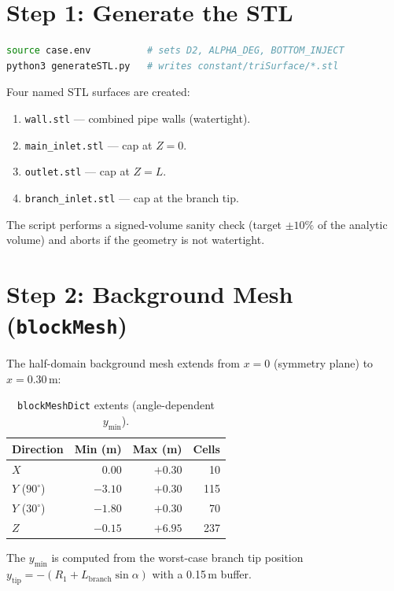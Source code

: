 \documentclass[12pt,a4paper]{report}
\begin{document}
\section{Step 1: Generate the STL}

\begin{lstlisting}[language=bash,numbers=none]
source case.env          # sets D2, ALPHA_DEG, BOTTOM_INJECT
python3 generateSTL.py   # writes constant/triSurface/*.stl
\end{lstlisting}

Four named STL surfaces are created:
\begin{enumerate}
  \item \texttt{wall.stl} --- combined pipe walls (watertight).
  \item \texttt{main\_inlet.stl} --- cap at $Z = 0$.
  \item \texttt{outlet.stl} --- cap at $Z = L$.
  \item \texttt{branch\_inlet.stl} --- cap at the branch tip.
\end{enumerate}

The script performs a signed-volume sanity check (target $\pm 10\%$
of the analytic volume) and aborts if the geometry is not watertight.


\section{Step 2: Background Mesh (\texttt{blockMesh})}

The half-domain background mesh extends from $x = 0$ (symmetry plane)
to $x = 0.30$\,m:

\begin{table}[H]
\centering
\caption{\texttt{blockMeshDict} extents (angle-dependent $y_{\min}$).}
\begin{tabular}{@{}lrrr@{}}
\toprule
\textbf{Direction} & \textbf{Min (m)} & \textbf{Max (m)} & \textbf{Cells} \\
\midrule
$X$ & $0.00$ & $+0.30$ & 10 \\
$Y$ ($90^{\circ}$) & $-3.10$ & $+0.30$ & 115 \\
$Y$ ($30^{\circ}$) & $-1.80$ & $+0.30$ & 70 \\
$Z$ & $-0.15$ & $+6.95$ & 237 \\
\bottomrule
\end{tabular}
\end{table}

The $y_{\min}$ is computed from the worst-case branch tip position
$y_{\mathrm{tip}} = -(R_1 + L_{\mathrm{branch}} \sin\alpha)$ with a
0.15\,m buffer.
\end{document}
